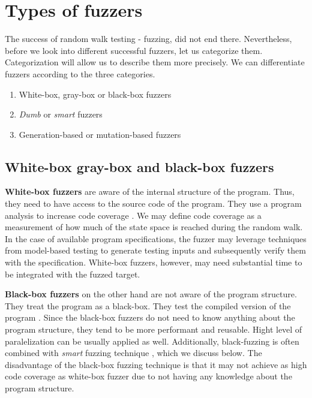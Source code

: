 \section{Types of fuzzers}
\label{sub:Types of fuzzers}
The success of random walk testing - fuzzing, did not end there. Nevertheless, before we look into different successful fuzzers, let us categorize them. Categorization will allow us to describe them more precisely. We can differentiate fuzzers according to the three categories.
\begin{enumerate}
    \item White-box, gray-box or black-box fuzzers
    \item \emph{Dumb} or \emph{smart} fuzzers
    \item Generation-based or mutation-based fuzzers
\end{enumerate}

\subsection{White-box gray-box and black-box fuzzers}
\label{ssub:White-box gray-box and black-box fuzzers}
\textbf{White-box fuzzers} are aware of the internal structure of the program. Thus, they need to have access to the source code of the program. They use a program analysis to increase code coverage \cite{neystadt2008automated}. We may define code coverage as a measurement of how much of the state space is reached during the random walk. In the case of available program specifications, the fuzzer may leverage techniques from model-based testing to generate testing inputs and subsequently verify them with the specification. White-box fuzzers, however, may need substantial time to be integrated with the fuzzed target.

\textbf{Black-box fuzzers} on the other hand are not aware of the program structure. They treat the program as a black-box. They test the compiled version of the program \cite{takanen2018fuzzing}. Since the black-box fuzzers do not need to know anything about the program structure, they tend to be more performant and reusable. Hight level of paralelization can be usually applied as well. Additionally, black-fuzzing is often combined with \emph{smart} fuzzing technique \cite{neystadt2008automated}, which we discuss below. The disadvantage of the black-box fuzzing technique is that it may not achieve as high code coverage as white-box fuzzer due to not having any knowledge about the program structure.

